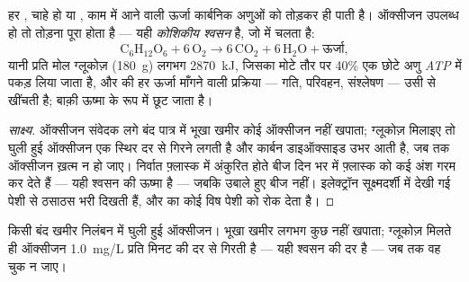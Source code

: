 \begin{proposition}[कोशिकीय श्वसन]\label{prop:g10:cell-metabolism:respiration}
हर , चाहे  हो या , काम में आने वाली ऊर्जा कार्बनिक
अणुओं को तोड़कर ही पाती है। ऑक्सीजन उपलब्ध हो तो तोड़ना पूरा होता है ---
यही \emph{कोशिकीय श्वसन} है, जो  में
चलता है:
\[
\mathrm{C_6H_{12}O_6} + 6\,\mathrm{O_2} \longrightarrow
6\,\mathrm{CO_2} + 6\,\mathrm{H_2O} + \text{ऊर्जा},
\]
यानी प्रति मोल ग्लूकोज़ (\qty{180}{g}) लगभग \qty{2870}{kJ}, जिसका मोटे
तौर पर 40\% एक छोटे अणु \emph{ATP} में पकड़ लिया जाता है, और
 की हर ऊर्जा माँगने वाली प्रक्रिया --- गति, परिवहन, संश्लेषण ---
उसी से खींचती है; बाक़ी ऊष्मा के रूप में छूट जाता है।
\end{proposition}
\begin{proof}[साक्ष्य]
ऑक्सीजन संवेदक लगे बंद पात्र में भूखा खमीर कोई ऑक्सीजन नहीं खपाता;
ग्लूकोज़ मिलाइए तो घुली हुई ऑक्सीजन एक स्थिर दर से गिरने लगती है और
कार्बन डाइऑक्साइड उभर आती है, जब तक ऑक्सीजन ख़त्म न हो जाए। निर्वात
फ़्लास्क में अंकुरित होते बीज दिन भर में फ़्लास्क को कई अंश गरम कर देते
हैं --- यही श्वसन की ऊष्मा है --- जबकि उबाले हुए बीज नहीं। इलेक्ट्रॉन
सूक्ष्मदर्शी में देखी गई पेशी   से ठसाठस भरी दिखती
हैं, और  का कोई विष पेशी को रोक देता है।
\end{proof}

\begin{omfigure}

{\small किसी बंद खमीर निलंबन में घुली हुई ऑक्सीजन। भूखा खमीर लगभग कुछ
नहीं खपाता; ग्लूकोज़ मिलते ही ऑक्सीजन \qty{1.0}{mg/L} प्रति मिनट की दर
से गिरती है --- यही श्वसन की दर है --- जब तक वह चुक न जाए।}
\end{omfigure}


